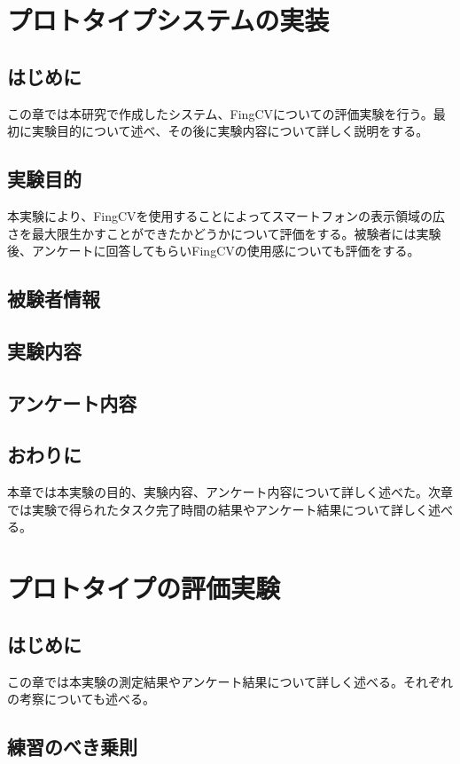 \documentclass[11pt,a4j, titlepage]{jarticle} %
\begin{document}
\newpage
\section{プロトタイプシステムの実装}
\subsection{はじめに}
この章では本研究で作成したシステム、FingCVについての評価実験を行う。最初に実験目的について述べ、その後に実験内容について詳しく説明をする。

\subsection{実験目的}
本実験により、FingCVを使用することによってスマートフォンの表示領域の広さを最大限生かすことができたかどうかについて評価をする。被験者には実験後、アンケートに回答してもらいFingCVの使用感についても評価をする。

\subsection{被験者情報}


\subsection{実験内容}


\subsection{アンケート内容}

\subsection{おわりに}
本章では本実験の目的、実験内容、アンケート内容について詳しく述べた。次章では実験で得られたタスク完了時間の結果やアンケート結果について詳しく述べる。

\newpage
\section{プロトタイプの評価実験}
\subsection{はじめに}
この章では本実験の測定結果やアンケート結果について詳しく述べる。それぞれの考察についても述べる。


\subsection{練習のべき乗則}
\end{document}
